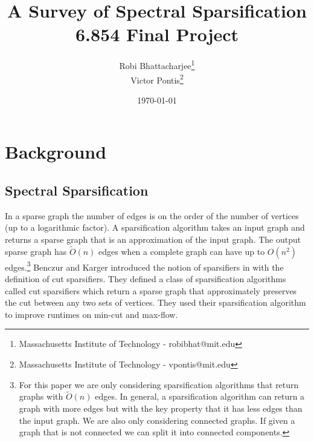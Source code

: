 \documentclass[12pt,twoside]{article}
\title{A Survey of Spectral Sparsification \\
        6.854 Final Project}
\date{\today}
\author{Robi Bhattacharjee\thanks{Massachusetts Institute of Technology - robibhat@mit.edu} \\
        Victor Pontis\thanks{Massachusetts Institute of Technology - vpontis@mit.edu} }
\begin{document}
\maketitle


\tableofcontents

\section{Background}

\subsection{Spectral Sparsification}

In a sparse graph the number of edges is on the order of the number of vertices (up to a logarithmic factor). A sparsification algorithm takes an input graph and returns a sparse graph that is an approximation of the input graph. The output sparse graph has $\tilde{O}(n)$ edges when a complete graph can have up to $O(n^2)$ edges.\footnote{For this paper we are only considering sparsification algorithms that return graphs with $\tilde{O}(n)$ edges. In general, a sparsification algorithm can return a graph with more edges but with the key property that it has less edges than the input graph. We are also only considering connected graphs. If given a graph that is not connected we can split it into connected components.} Benczur and Karger introduced the notion of sparsifiers in  \cite{benczur-karger-mincut} with the definition of cut sparsifiers. They defined a class of sparsification algorithms called cut sparsifiers which return a sparse graph that approximately preserves the cut between any two sets of vertices. They used their sparsification algorithm to improve runtimes on min-cut and max-flow. 
\end{document}
